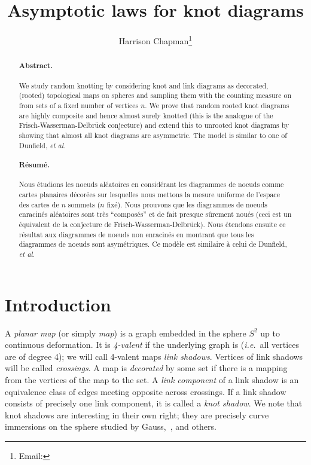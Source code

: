\documentclass[submission%
]{dmtcs}
\author{Harrison Chapman\addressmark{1}\thanks{Email: \email{hchapman@math.uga.edu}}}
\title[Asymptotic laws for knot diagrams]{Asymptotic laws for knot diagrams}
\begin{document}
\maketitle
\begin{abstract}
  \paragraph{Abstract.}
  We study random knotting by considering knot and link diagrams as
  decorated, (rooted) topological maps on spheres and sampling them
  with the counting measure on from sets of a fixed number of vertices
  $n$. We prove that random rooted knot diagrams are highly composite
  and hence almost surely knotted (this is the analogue of the
  Frisch-Wasserman-Delbr\"uck conjecture) and extend this to unrooted
  knot diagrams by showing that almost all knot diagrams are
  asymmetric. The model is similar to one of Dunfield, \textit{et al.}

  \paragraph{R\'esum\'e.} Nous \'etudions les noeuds al\'eatoires en
  consid\'erant les diagrammes de noeuds comme cartes planaires
  d\'ecor\'ees sur lesquelles nous mettons la mesure uniforme de
  l'espace des cartes de $n$ sommets ($n$ fix\'e). Nous prouvons que
  les diagrammes de noeuds enracin\'es al\'eatoires sont tr\`es
  ``compos\'es'' et de fait presque s\^{u}rement nou\'es (ceci est un
  \'equivalent de la conjecture de Frisch-Wasserman-Delbr\"uck). Nous
  \'etendons ensuite  ce r\'esultat aux diagrammes de noeuds
  non enracin\'es en montrant que tous les diagrammes de noeuds sont
  asym\'etriques. Ce mod\`ele est similaire \`a celui de Dunfield,
  \textit{et al.}
\end{abstract}

\section{Introduction}
\label{sec:in}

A \emph{planar map} (or simply \emph{map}) is a graph embedded in the
sphere $S^2$ up to continuous deformation. It is \emph{4-valent} if
the underlying graph is (\textit{i.e.}\ all vertices are of degree 4); we will
call 4-valent maps \emph{link shadows}. Vertices of link shadows will
be called \emph{crossings}. A map is \emph{decorated} by some set if
there is a mapping from the vertices of the map to the set. A
\emph{link component} of a link shadow is an equivalence class of
edges meeting opposite across crossings. If a link shadow consists of
precisely one link component, it is called a \emph{knot shadow}. We
note that knot shadows are interesting in their own right; they are precisely curve
immersions on the sphere studied by Gauss,~\cite{0036-0279-50-1-R01},
and others.
\end{document}
